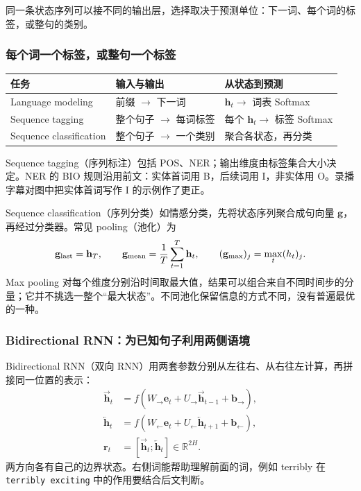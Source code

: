 同一条状态序列可以接不同的输出层，选择取决于预测单位：下一词、每个词的标签，或整句的类别。

\subsubsection{每个词一个标签，或整句一个标签}

\begin{center}
\small
\begin{tabularx}{\textwidth}{@{}l X X@{}}
\toprule
任务 & 输入与输出 & 从状态到预测 \\
\midrule
Language modeling & 前缀 $\to$ 下一词 & $\mathbf h_t\to$ 词表 Softmax \\
Sequence tagging & 整个句子 $\to$ 每词标签 & 每个 $\mathbf h_t\to$ 标签 Softmax \\
Sequence classification & 整个句子 $\to$ 一个类别 & 聚合各状态，再分类 \\
\bottomrule
\end{tabularx}
\end{center}
Sequence tagging（序列标注）包括 POS、NER；输出维度由标签集合大小决定。NER 的 BIO 规则沿用前文：实体首词用 B，后续词用 I，非实体用 O。录播字幕对图中把实体首词写作 I 的示例作了更正。

Sequence classification（序列分类）如情感分类，先将状态序列聚合成句向量 $\mathbf g$，再经过分类器。常见 pooling（池化）为
\[
 \mathbf g_{\rm last}=\mathbf h_T,\qquad
 \mathbf g_{\rm mean}=\frac1T\sum_{t=1}^{T}\mathbf h_t,\qquad
 (\mathbf g_{\rm max})_j=\max_t(h_t)_j.
\]
Max pooling 对每个维度分别沿时间取最大值，结果可以组合来自不同时间步的分量；它并不挑选一整个“最大状态”。不同池化保留信息的方式不同，没有普遍最优的一种。

\subsubsection{Bidirectional RNN：为已知句子利用两侧语境}

Bidirectional RNN（双向 RNN）用两套参数分别从左往右、从右往左计算，再拼接同一位置的表示：
\begin{align*}
 \overrightarrow{\mathbf h}_t
 &=f(W_{\to}\mathbf e_t+U_{\to}\overrightarrow{\mathbf h}_{t-1}+\mathbf b_{\to}),\\
 \overleftarrow{\mathbf h}_t
 &=f(W_{\leftarrow}\mathbf e_t+U_{\leftarrow}\overleftarrow{\mathbf h}_{t+1}+\mathbf b_{\leftarrow}),\\
 \mathbf r_t&=[\overrightarrow{\mathbf h}_t;\overleftarrow{\mathbf h}_t]\in\mathbb R^{2H}.
\end{align*}
两方向各有自己的边界状态。右侧词能帮助理解前面的词，例如 terribly 在 \texttt{terribly exciting} 中的作用要结合后文判断。

